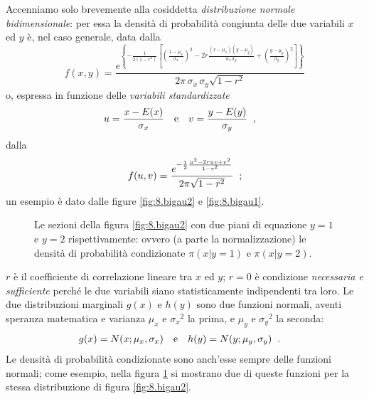 Accenniamo solo brevemente alla cosiddetta
\emph{distribuzione normale bidimensionale}: per essa la
densit\`a di probabilit\`a congiunta delle due variabili $x$
ed $y$ \`e, nel caso generale, data dalla
\begin{equation*}
  f(x, y) = \frac{ e^{ \left\{ - \frac{1}{2 (1 - r^2)}
        \left[ \left( \frac{x - \mu_x}{ \sigma_x }
          \right)^2 - 2 r \frac{(x - \mu_x) (y - \mu_y
            )}{\sigma_x  \,\sigma_y} + \left( \frac{y -
              \mu_y}{ \sigma_y } \right)^2 \right]
      \right\} } }{2 \pi \, \sigma_x \, \sigma_y \sqrt{1 -
      r^2}}
\end{equation*}
o, espressa in funzione delle \emph{variabili
  standardizzate}
\begin{align*}
  u &= \frac{x - E(x)}{\sigma_x} &&\text{e} & v &= \frac{y
      - E(y)}{\sigma_y} \;\; ,
\end{align*}
dalla
\begin{equation*}
  f(u,v) = \frac{ e^{ - \frac{1}{2} \frac{u^2 -2ruv +
        v^2}{1 - r^2} } }{ 2 \pi \sqrt{1 - r^2} } \;\; ;
\end{equation*}
un esempio \`e dato dalle figure \ref{fig:8.bigau2} e
\ref{fig:8.bigau1}.

\begin{figure}[htbp]
  \vspace*{2ex}
  \begin{center}  \end{center}
  \caption[Funzione normale bidimensionale (probabilit\`a
  condizionate)]{Le sezioni della figura \ref{fig:8.bigau2}
    con due piani di equazione $y=1$ e $y=2$
    rispettivamente: ovvero (a parte la normalizzazione) le
    densit\`a di probabilit\`a condizionate $\pi(x | y=1)$ e
    $\pi(x | y=2)$.}
  \label{fig:8.bigau3}
\end{figure}
$r$ \`e il coefficiente di correlazione lineare tra $x$ ed
$y$; $r = 0$ \`e condizione \emph{necessaria e sufficiente}
perch\'e le due variabili siano statisticamente indipendenti
tra loro.  Le due distribuzioni marginali $g(x)$ e $h(y)$
sono due funzioni normali, aventi speranza matematica e
varianza $\mu_x$ e ${\sigma_x}^2$ la prima, e $\mu_y$ e
${\sigma_y}^2$ la seconda:
\begin{align*}
  g(x) &= N(x; \mu_x, \sigma_x) &&\text{e} &
  h(y) &= N(y; \mu_y, \sigma_y) \;\; .
\end{align*}
Le densit\`a di probabilit\`a condizionate sono anch'esse
sempre delle funzioni normali; come esempio, nella figura
\ref{fig:8.bigau3} si mostrano due di queste funzioni per
la stessa distribuzione di figura \ref{fig:8.bigau2}.%

